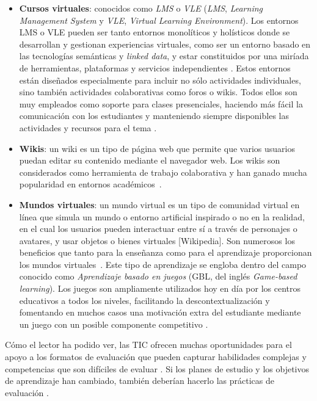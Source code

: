 \begin{itemize}
\item \textbf{Cursos virtuales}: conocidos como \emph{LMS} o \emph{VLE} (\emph{LMS}, \emph{Learning Management System} y \emph{VLE}, \emph{Virtual Learning Environment}). Los entornos LMS o VLE pueden ser tanto entornos monolíticos y holísticos donde se desarrollan y gestionan experiencias virtuales, como ser un entorno basado en las tecnologías semánticas y \emph{linked data}, y estar constituidos por una miríada de herramientas, plataformas y servicios independientes \cite{Dodero:2013}. Estos entornos están diseñados especialmente para incluir no sólo actividades individuales, sino también actividades colaborativas como foros o wikis. Todos ellos son muy empleados como soporte para clases presenciales, haciendo más fácil la comunicación con los estudiantes y manteniendo siempre disponibles las actividades y recursos para el tema \cite{Zafra:2011, Munkhchimeg:2013}.
\item \textbf{Wikis}: un wiki es un tipo de página web que permite que varios usuarios puedan editar su contenido mediante el navegador web. Los wikis son considerados como herramienta de trabajo colaborativa y han ganado mucha popularidad en entornos académicos~\cite{judd:2010}.
\item \textbf{Mundos virtuales}:  un mundo virtual es un tipo de comunidad virtual en línea que simula un mundo o entorno artificial inspirado o no en la realidad, en el cual los usuarios pueden interactuar entre sí a través de personajes o avatares, y usar objetos o bienes virtuales [Wikipedia]. Son numerosos los beneficios que tanto para la enseñanza como para el aprendizaje proporcionan los mundos virtuales~\cite{jarmon:2009}. Este tipo de aprendizaje se engloba dentro del campo conocido como \emph{Aprendizaje basado en juegos} (GBL, del inglés \emph{Game-based learning}). Los juegos son ampliamente utilizados hoy en día por los centros educativos a todos los niveles, facilitando la descontextualización y fomentando en muchos casos una motivación extra del estudiante mediante un juego con un posible componente competitivo \cite{Bellotti:2013,Berns:2013,Palomo-Duarte:2012}.
\end{itemize}

Cómo el lector ha podido ver, las TIC ofrecen muchas oportunidades para el apoyo a los formatos de evaluación que pueden capturar habilidades complejas y competencias que son difíciles de evaluar \cite{Redecker:2013}. Si los planes de estudio y los objetivos de aprendizaje han cambiado, también deberían hacerlo las prácticas de evaluación \cite{Cachia:2011}.


